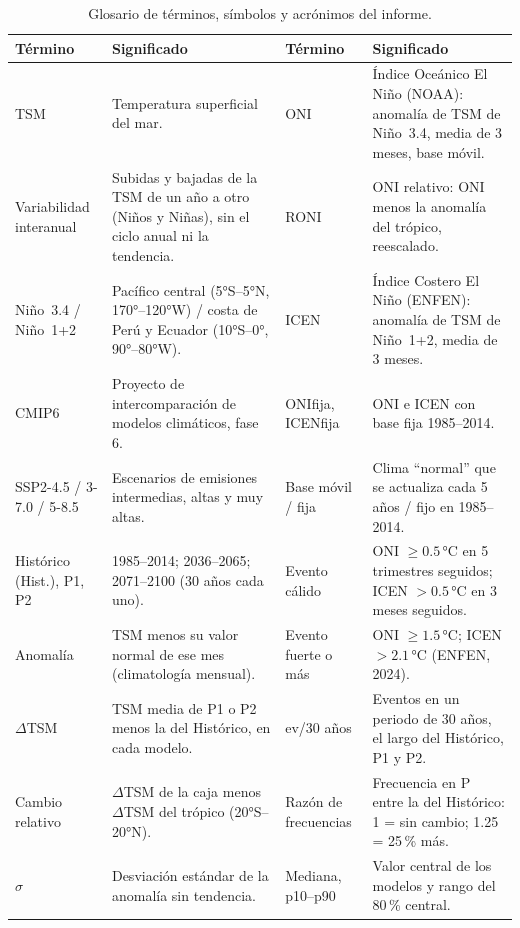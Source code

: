 \documentclass[11pt,a4paper]{article}
\begin{document}
\begin{table}[H]
\caption{Glosario de términos, símbolos y acrónimos del informe.}
\label{tab:glosario}
\centering
\scriptsize
\renewcommand{\arraystretch}{1.05}
\setlength{\tabcolsep}{3pt}
\begin{tabular}{@{}L{2.0cm}L{\textwidth-2.0cm-5\tabcolsep\relax}|L{2.0cm}L{\textwidth-2.0cm-5\tabcolsep\relax}@{}}
\toprule
\textbf{Término} & \textbf{Significado} & \textbf{Término} & \textbf{Significado} \\
\midrule
TSM & Temperatura superficial del mar. & ONI & Índice Oceánico El Niño (NOAA): anomalía de TSM de Niño~3.4, media de 3 meses, base móvil. \\
Variabilidad interanual & Subidas y bajadas de la TSM de un año a otro (Niños y Niñas), sin el ciclo anual ni la tendencia. & RONI & ONI relativo: ONI menos la anomalía del trópico, reescalado. \\
Niño~3.4 / Niño~1+2 & Pacífico central (5°S--5°N, 170°--120°W) / costa de Perú y Ecuador (10°S--0°, 90°--80°W). & ICEN & Índice Costero El Niño (ENFEN): anomalía de TSM de Niño~1+2, media de 3 meses. \\
CMIP6 & Proyecto de intercomparación de modelos climáticos, fase 6. & ONIfija, ICENfija & ONI e ICEN con base fija 1985--2014. \\
SSP2-4.5 / 3-7.0 / 5-8.5 & Escenarios de emisiones intermedias, altas y muy altas. & Base móvil / fija & Clima ``normal'' que se actualiza cada 5 años / fijo en 1985--2014. \\
Histórico (Hist.), P1, P2 & 1985--2014; 2036--2065; 2071--2100 (30 años cada uno). & Evento cálido & ONI $\geq 0.5$\,°C en 5 trimestres seguidos; ICEN $> 0.5$\,°C en 3 meses seguidos. \\
Anomalía & TSM menos su valor normal de ese mes (climatología mensual). & Evento fuerte o más & ONI $\geq 1.5$\,°C; ICEN $> 2.1$\,°C (ENFEN, 2024). \\
$\Delta$TSM & TSM media de P1 o P2 menos la del Histórico, en cada modelo. & ev/30 años & Eventos en un periodo de 30 años, el largo del Histórico, P1 y P2. \\
Cambio relativo & $\Delta$TSM de la caja menos $\Delta$TSM del trópico (20°S--20°N). & Razón de frecuencias & Frecuencia en P entre la del Histórico: 1 = sin cambio; 1.25 = 25\,\% más. \\
$\sigma$ & Desviación estándar de la anomalía sin tendencia. & Mediana, p10--p90 & Valor central de los modelos y rango del 80\,\% central. \\

\end{tabular}
\end{table}
\end{document}
